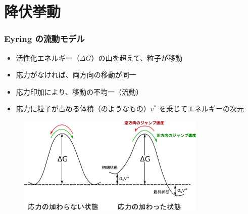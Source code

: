 \documentclass[1４pt, dvipdfmx]{beamer}
\begin{document}
\section{降伏挙動}


	

\begin{frame}
\frametitle{Eyring の流動モデル}

\begin{itemize}
\item 活性化エネルギー（$\Delta G$）の山を超えて、粒子が移動
\item 応力がなければ、両方向の移動が同一
\item 応力印加により、移動の不均一（流動）
\item 応力に粒子が占める体積（のようなもの）$v^*$ を乗じてエネルギーの次元
\end{itemize}

\begin{figure}
 \centering
	\includegraphics[width=9cm]{flow_under_stress.png}
\end{figure}
\end{frame}
\end{document}
